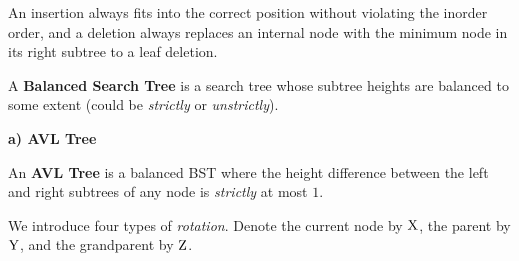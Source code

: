 \documentclass{article}
\begin{document}
\begin{center}
\end{center}

An insertion always fits into the correct position without violating the inorder order, and a deletion always replaces an internal node with the minimum node in its right subtree to a leaf deletion.

A \textbf{Balanced Search Tree} is a search tree whose subtree heights are balanced to some extent (could be \emph{strictly} or \emph{unstrictly}).

\vspace{2ex}

\textbf{a) AVL Tree}

An \textbf{AVL Tree} is a balanced BST where the height difference between the left and right subtrees of any node is \emph{strictly} at most $1$.

We introduce four types of \emph{rotation}. Denote the current node by $\text X$, the parent by $\text Y$, and the grandparent by $\text Z$.
\end{document}
